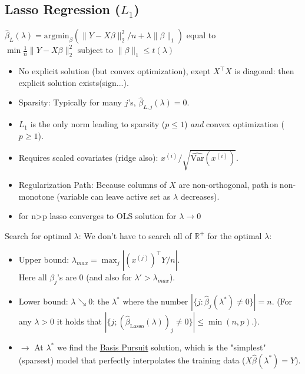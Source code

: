 \subsection{Lasso Regression ($L_1$)}
$ \hat{\beta}_L(\lambda) = \text{argmin}_\beta (\|Y - X\beta\|_2^2 / n + \lambda \|\beta\|_1) $
equal to $\min \frac{1}{n} \|Y - X\beta\|_2^2 \text{ subject to } \|\beta\|_1 \le t(\lambda)$
\begin{itemize}
    \item No explicit solution (but convex optimization), exept $X^\top X$ is diagonal: then explicit solution exists(sign...).
    \item Sparsity: Typically for many $j$'s, $\hat{\beta}_{L,j}(\lambda) = 0$.
    \item $L_1$ is the only norm leading to sparsity ($p \leq 1$) \textit{and} convex optimization ($p \geq 1$).
    \item Requires scaled covariates (ridge also): $x^{(i)} / \sqrt{\widehat{\text{Var}}(x^{(i)})}$.
    \item Regularization Path: Because columns of $X$ are non-orthogonal, path is non-monotone (variable can leave active set as $\lambda$ decreases).
    \item for n>p lasso converges to OLS solution for $\lambda \to 0$
\end{itemize}

Search for optimal $\lambda$:
We don't have to search all of $\mathbb{R}^+$ for the optimal $\lambda$:
\begin{itemize}
    \item Upper bound: $\lambda_{max} = \max_j |(x^{(j)})^\top Y/n|$.
    \\ Here all $\beta_j$'s are $0$ (and also for $\lambda' > \lambda_{max}$).
    \item Lower bound: $\lambda \searrow 0$: the $\lambda^*$ where the number $|\{j : \hat{\beta}_j(\lambda^*) \neq 0\}| = n$.
    (For any $\lambda > 0$ it holds that $|\{j; (\hat{\beta}_{\text{Lasso}}(\lambda))_j \neq 0\}| \le \min(n, p)$.).
    \item $\to$ At $\lambda^*$ we find the \underline{Basis Pursuit} solution, which is the "simplest" (sparsest) model that perfectly interpolates the training data ($X\hat{\beta}(\lambda^*) = Y$).
\end{itemize}